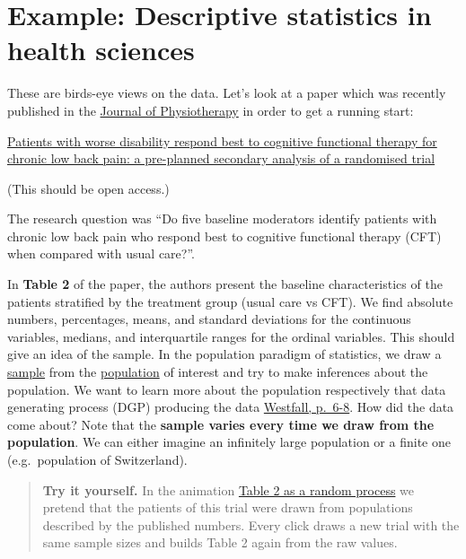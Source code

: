 \documentclass[
]{book}
\begin{document}
\section{Example: Descriptive statistics in health sciences}\label{example_study1_physio}

These are birds-eye views on the data. Let's look at a paper which was recently published in the
\href{https://www.sciencedirect.com/journal/journal-of-physiotherapy}{Journal of Physiotherapy} in order to get a running start:

\href{https://www.sciencedirect.com/science/article/pii/S183695532400081X?via\%3Dihub}{Patients with worse disability respond best to cognitive functional therapy for chronic low back pain: a pre-planned secondary analysis of a randomised trial}

(This should be open access.)

The research question was ``Do five baseline moderators identify patients with chronic low back pain who respond best to cognitive
functional therapy (CFT) when compared with usual care?''.

In \textbf{Table 2} of the paper, the authors present the baseline characteristics of the patients stratified by the treatment group (usual care vs CFT).
We find absolute numbers, percentages, means, and standard deviations for the continuous variables, medians, and interquartile ranges for the ordinal variables.
This should give an idea of the sample. In the population paradigm of statistics, we draw a \href{https://en.wikipedia.org/wiki/Sampling_(statistics)}{sample} from
the \href{https://en.wikipedia.org/wiki/Statistical_population}{population} of interest and try to make inferences about the population. We want to learn
more about the population respectively that data generating process (DGP) producing the data \href{https://www.routledge.com/Understanding-Regression-Analysis-A-Conditional-Distribution-Approach/Westfall-Arias/p/book/9780367493516}{Westfall, p.~6-8}.
How did the data come about?
Note that the \textbf{sample varies every time we draw from the population}.
We can either imagine an infinitely large population or a finite one (e.g.~population of Switzerland).

\begin{quote}
\textbf{Try it yourself.} In the animation
\href{https://jdegenfellner.github.io/Script_QM1_ZHAW/animations/08_Tabelle_2_neu_ziehen_CFT.html}{Table 2 as a random process}
we pretend that the patients of this trial were drawn from populations described by the published numbers.
Every click draws a new trial with the same sample sizes and builds Table 2 again from the raw values.
\end{quote}
\end{document}
